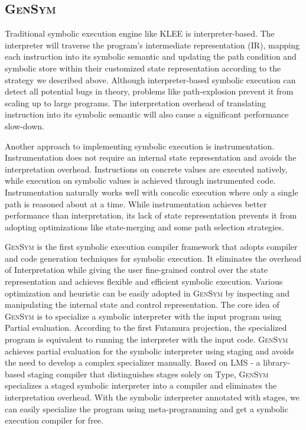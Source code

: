 \documentclass[sigplan, nonacm]{acmart}\settopmatter{printfolios=true,printccs=false,printacmref=false}
\newcommand{\tool}{\textsc{GenSym}\xspace}
\begin{document}
\subsection{\tool}
Traditional symbolic execution engine like KLEE\cite{cadar2008klee} is interpreter-based. The interpreter will traverse the program's intermediate representation (IR), mapping each instruction into its symbolic semantic and updating the path condition and symbolic store within their customized state representation according to the strategy we described above. Although interpreter-based symbolic execution can detect all potential bugs in theory, problems like path-explosion \cite{baldoni2018survey} prevent it from scaling up to large programs. The interpretation overhead of translating instruction into its symbolic semantic will also cause a significant performance slow-down.\par
Another approach to implementing symbolic execution is instrumentation\cite{10.1145/1180405.1180445, CREST}. Instrumentation does not require an internal state representation and avoids the interpretation overhead. Instructions on concrete values are executed natively, while execution on symbolic values is achieved through instrumented code. Instrumentation naturally works well with concolic execution \cite{godefroid2005dart, sen2005cute} where only a single path is reasoned about at a time. While instrumentation achieves better performance than interpretation, its lack of state representation prevents it from adopting optimizations like state-merging and some path selection strategies. \par
\tool is the first symbolic execution compiler framework that adopts compiler and code generation techniques for symbolic execution. It eliminates the overhead of Interpretation while giving the user fine-grained control over the state representation and achieves flexible and efficient symbolic execution. Various optimization and heuristic can be easily adopted in \tool by inspecting and manipulating the internal state and control representation. The core idea of \tool is to specialize a symbolic interpreter with the input program using Partial evaluation\cite{damian1999partial}. According to the first Futamura projection\cite{Futamura1971, Futamura1999}, the specialized program is equivalent to running the interpreter with the input code. \tool achieves partial evaluation for the symbolic interpreter using staging\cite{DBLP:conf/pepm/TahaS97} and avoids the need to develop a complex specializer manually. Based on LMS\cite{rompf2010lightweight} - a library-based staging compiler that distinguishes stages solely on Type, \tool specializes a staged symbolic interpreter into a compiler and eliminates the interpretation overhead. With the symbolic interpreter annotated with stages, we can easily specialize the program using meta-programming and get a symbolic execution compiler for free.
\end{document}
